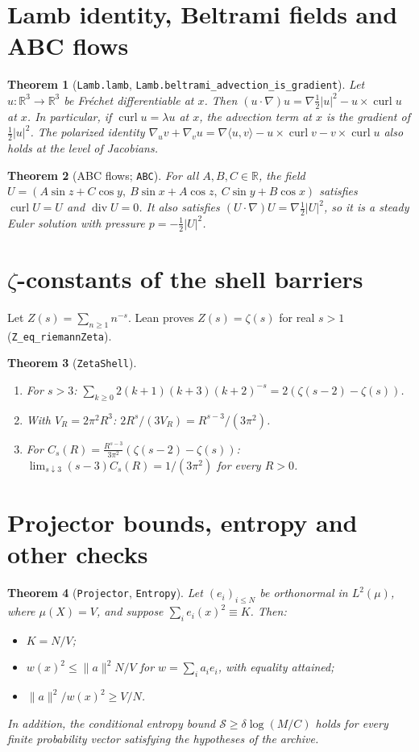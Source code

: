 \documentclass[11pt]{article}
\newtheorem{theorem}{Theorem}[section]
\theoremstyle{remark}
\newcommand{\lean}[1]{\texttt{#1}}
\newcommand{\curl}{\operatorname{curl}}
\begin{document}
\section{Lamb identity, Beltrami fields and ABC flows}
\begin{theorem}[\lean{Lamb.lamb}, \lean{Lamb.beltrami\_advection\_is\_gradient}]
Let $u:\mathbb R^3\to\mathbb R^3$ be Fr\'echet differentiable at $x$. Then
$(u\cdot\nabla)u=\nabla\tfrac12|u|^2-u\times\curl u$ at $x$. In particular, if
$\curl u=\lambda u$ at $x$, the advection term at $x$ is the gradient of $\tfrac12|u|^2$.
The polarized identity $\nabla_uv+\nabla_vu=\nabla\langle u,v\rangle-u\times\curl v
-v\times\curl u$ also holds at the level of Jacobians.
\end{theorem}
\begin{theorem}[ABC flows; \lean{ABC}]
For all $A,B,C\in\mathbb R$, the field
$U=(A\sin z+C\cos y,\ B\sin x+A\cos z,\ C\sin y+B\cos x)$ satisfies $\curl U=U$ and
$\operatorname{div}U=0$. It also satisfies $(U\cdot\nabla)U=\nabla\tfrac12|U|^2$, so it is a
steady Euler solution with pressure $p=-\tfrac12|U|^2$.
\end{theorem}

\section{$\zeta$-constants of the shell barriers}
Let $Z(s)=\sum_{n\ge1}n^{-s}$. Lean proves $Z(s)=\zeta(s)$ for real $s>1$
(\lean{Z\_eq\_riemannZeta}).
\begin{theorem}[\lean{ZetaShell}]
\begin{enumerate}
\item For $s>3$: $\sum_{k\ge0}2(k+1)(k+3)(k+2)^{-s}=2(\zeta(s-2)-\zeta(s))$.
\item With $V_R=2\pi^2R^3$: $2R^s/(3V_R)=R^{s-3}/(3\pi^2)$.
\item For $C_s(R)=\frac{R^{s-3}}{3\pi^2}(\zeta(s-2)-\zeta(s))$:
$\lim_{s\downarrow3}(s-3)C_s(R)=1/(3\pi^2)$ for every $R>0$.
\end{enumerate}
\end{theorem}

\section{Projector bounds, entropy and other checks}
\begin{theorem}[\lean{Projector}, \lean{Entropy}]
Let $(e_i)_{i\le N}$ be orthonormal in $L^2(\mu)$, where $\mu(X)=V$, and suppose
$\sum_ie_i(x)^2\equiv K$. Then:
\begin{itemize}
\item $K=N/V$;
\item $w(x)^2\le\|a\|^2N/V$ for $w=\sum_i a_ie_i$, with equality attained;
\item $\|a\|^2/w(x)^2\ge V/N$.
\end{itemize}
In addition, the conditional entropy bound $\mathcal S\ge\delta\log(M/C)$ holds for every
finite probability vector satisfying the hypotheses of the archive.
\end{theorem}
\end{document}
